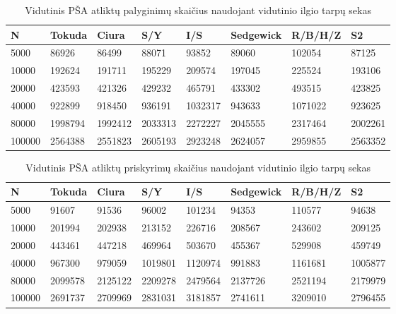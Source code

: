 \documentclass{VUMIFInfKursinis}
\begin{document}
\begin{table}[H]
  \caption{Vidutinis PŠA atliktų palyginimų skaičius naudojant vidutinio ilgio tarpų sekas}
  \label{iss_medium_comparisons}
  \begin{tabular}{|l|l|l|l|l|l|l|l|}
  \hline
  N      & Tokuda  & Ciura   & S/Y     & I/S     & Sedgewick & R/B/H/Z & S2     \\ \hline
  5000   & 86926   & 86499   & 88071   & 93852   & 89060     & 102054  & 87125   \\ \hline
  10000  & 192624  & 191711  & 195229  & 209574  & 197045    & 225524  & 193106  \\ \hline
  20000  & 423593  & 421326  & 429232  & 465791  & 433302    & 493515  & 423825  \\ \hline
  40000  & 922899  & 918450  & 936191  & 1032317 & 943633    & 1071022 & 923625  \\ \hline
  80000  & 1998794 & 1992412 & 2033313 & 2272227 & 2045555   & 2317464 & 2002261 \\ \hline
  100000 & 2564388 & 2551823 & 2605193 & 2923248 & 2624057   & 2959855 & 2563352 \\ \hline
  \end{tabular}
\end{table}

\begin{table}[H]
  \caption{Vidutinis PŠA atliktų priskyrimų skaičius naudojant vidutinio ilgio tarpų sekas}
  \label{iss_medium_assignments}
  \begin{tabular}{|l|l|l|l|l|l|l|l|}
  \hline
  N      & Tokuda  & Ciura   & S/Y     & I/S     & Sedgewick & R/B/H/Z & S2     \\ \hline
  5000   & 91607   & 91536   & 96002   & 101234  & 94353     & 110577  & 94638   \\ \hline
  10000  & 201994  & 202938  & 213152  & 226716  & 208567    & 243602  & 209125  \\ \hline
  20000  & 443461  & 447218  & 469964  & 503670  & 455367    & 529908  & 459749  \\ \hline
  40000  & 967300  & 979059  & 1019801 & 1120974 & 991883    & 1161681 & 1005877 \\ \hline
  80000  & 2099578 & 2125122 & 2209278 & 2479564 & 2137726   & 2521194 & 2179979 \\ \hline
  100000 & 2691737 & 2709969 & 2831031 & 3181857 & 2741611   & 3209010 & 2796455 \\ \hline
  \end{tabular}
\end{table}
\end{document}
